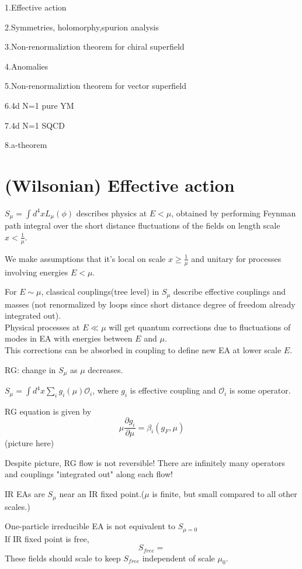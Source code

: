 \documentclass[type = bachelor]{fduthesis-en}
\begin{document}
1.Effective action

2.Symmetries, holomorphy,spurion analysis

3.Non-renormaliztion theorem for chiral superfield

4.Anomalies

5.Non-renormaliztion theorem for vector superfield

6.4d N=1 pure YM

7.4d N=1 SQCD

8.a-theorem
\section{(Wilsonian) Effective action}
$ S_{\mu} = \int d^{4}x L_{\mu}(\phi)$ describes physics at $E<\mu$, obtained by performing Feynman path integral over the short distance fluctuations of the fields on length scale $x<\frac{1}{\mu}$.

We make assumptions that it's local on scale $x \geq \frac{1}{\mu}$ and unitary for processes involving energies $E < \mu $.

For $E\sim\mu$, classical couplings(tree level) in $S_{\mu}$ describe effective couplings and masses (not renormalized by loops since short distance degree of freedom already integrated out).
\bigskip\\
Physical processes at $E \ll \mu$ will get quantum corrections due to fluctuations of modes in EA with energies between $E$ and $\mu$.
\bigskip\\
This corrections can be absorbed in coupling to define new EA at lower scale $E$.

RG: change in $S_{\mu}$ as $\mu$ decreases.

$S_{\mu} = \int d^{4}x \sum_{i} g_{i}(\mu)\mathcal{O}_{i}$, where $g_{i}$ is effective coupling and $\mathcal{O}_{i}$ is some operator.

RG equation is given by 
\begin{equation}
\label{RGeq}
\mu \frac{\partial g_{i}}{\partial \mu} = \beta_{i}(g_{F},\mu)
\end{equation}
(picture here)

Despite picture, RG flow is not reversible! There are infinitely many operators and couplings "integrated out" along each flow!

IR EAs are $S_{\mu}$ near an IR fixed point.($\mu$ is finite, but small compared to all other scales.)

One-particle irreducible EA is not equivalent to $S_{\mu=0}$
\bigskip\\
If IR fixed point is free,
\begin{equation}
\label{Sfree}
S_{free} = 
\end{equation}
These fields should scale to keep $S_{free}$ independent of scale $\mu_{0}$.
\end{document}
